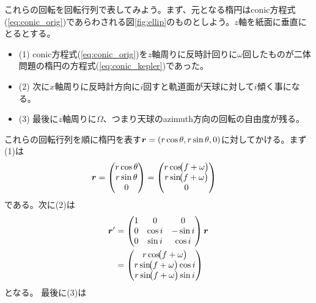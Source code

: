 これらの回転を回転行列で表してみよう。まず、元となる楕円はconic方程式(\ref{eq:conic_orig})であらわされる図\ref{fig:ellip}のものとしよう。$z$軸を紙面に垂直にとるとする。
\begin{itemize}
\item (1) conic方程式(\ref{eq:conic_orig})を$z$軸周りに反時計回りに$\omega$回したものが二体問題の楕円の方程式(\ref{eq:conic_kepler})であった。
\item (2) 次に$x$軸周りに反時計方向に$i$回すと軌道面が天球に対して$i$傾く事になる。\\
\item (3) 最後に$z$軸周りに$\Omega$、つまり天球のazimuth方向の回転の自由度が残る。
\end{itemize}

これらの回転行列を順に楕円を表す$\boldsymbol{r} = (r \cos{\theta}, r \sin{\theta},0)$に対してかける。まず(1)は
\begin{align}
\boldsymbol{r} &=
\begin{pmatrix}
r\cos\theta\\
r\sin\theta\\
0
\end{pmatrix}
=
\begin{pmatrix}
r\cos\!\bigl(f+\omega\bigr)\\
r\sin\!\bigl(f+\omega\bigr)\\
0
\end{pmatrix}
\end{align}
である。次に(2)は
\begin{align}
\boldsymbol{r}^\prime &=
\begin{pmatrix}
1 & 0        & 0\\
0 & \cos i   & -\sin i\\
0 & \sin i   &  \cos i
\end{pmatrix}
\boldsymbol{r} \\
&=
\begin{pmatrix}
r\cos\!\bigl(f+\omega\bigr)\\
r\sin\!\bigl(f+\omega\bigr)\cos i\\
r\sin\!\bigl(f+\omega\bigr)\sin i
\end{pmatrix}
\end{align}
となる。
最後に(3)は
